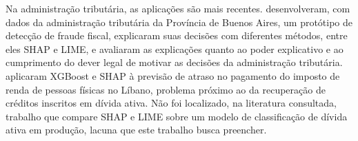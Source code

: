Na administração tributária, as aplicações são mais recentes.  desenvolveram, com dados da administração tributária da Província de Buenos Aires, um protótipo de detecção de fraude fiscal, explicaram suas decisões com diferentes métodos, entre eles SHAP e LIME, e avaliaram as explicações quanto ao poder explicativo e ao cumprimento do dever legal de motivar as decisões da administração tributária.  aplicaram XGBoost e SHAP à previsão de atraso no pagamento do imposto de renda de pessoas físicas no Líbano, problema próximo ao da recuperação de créditos inscritos em dívida ativa. Não foi localizado, na literatura consultada, trabalho que compare SHAP e LIME sobre um modelo de classificação de dívida ativa em produção, lacuna que este trabalho busca preencher.

